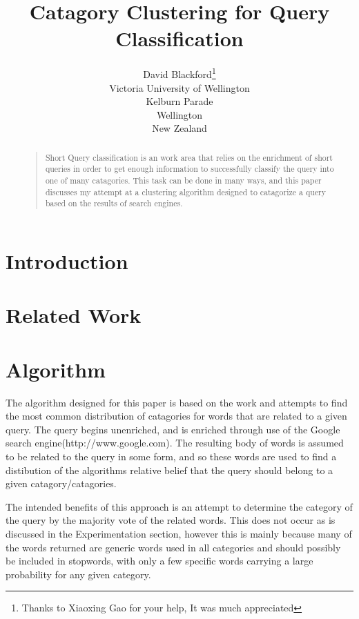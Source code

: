 \documentclass[letterpaper]{article}
\begin{document}
%
\title{Catagory Clustering for Query Classification}
\author{David Blackford\thanks{Thanks to Xiaoxing Gao for your help, It was much appreciated}\\
Victoria University of Wellington\\
Kelburn Parade\\
Wellington\\
New Zealand\\
}
\maketitle
\begin{abstract}
\begin{quote}
Short Query classification is an work area that relies on the enrichment of short queries in order to get enough information to successfully classify the query into 
one of many catagories. This task can be done in many ways, and this paper discusses my attempt at a clustering algorithm designed to catagorize a query based on the results of search engines.
\end{quote}
\end{abstract}
\section{Introduction}

\section{Related Work}



\section{Algorithm}
The algorithm designed for this paper is based on the work \cite{distCluster} and attempts to find the most common distribution of catagories for words that are related
to a given query. The query begins unenriched, and is enriched through use of the Google search engine(http://www.google.com). The resulting body of words is assumed
to be related to the query in some form, and so these words are used to find a distibution of the algorithms relative belief that the query should belong to a given catagory/catagories.


The intended benefits of this approach is an attempt to determine the category of the query by the majority vote of the related words. This does not occur as is discussed in the Experimentation section, however this is mainly because many of the words returned are generic words used in all categories and should possibly be included in stopwords, with only a few specific words carrying a large probability for any given category. 
\end{document}
